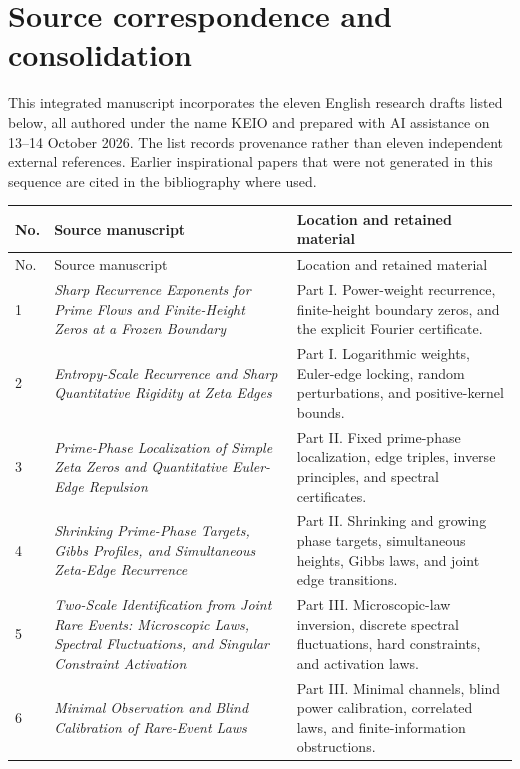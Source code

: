\documentclass[11pt,letterpaper]{article}
\theoremstyle{definition}
\theoremstyle{remark}
\newcommand{\1}{\mathbf 1}
\begin{document}
\clearpage
\section{Source correspondence and consolidation}
\label{sec:source-correspondence}
This integrated manuscript incorporates the eleven English research
drafts listed below, all authored under the name KEIO and prepared with
AI assistance on 13--14 October 2026. The list records provenance rather
than eleven independent external references. Earlier inspirational
papers that were not generated in this sequence are cited in the
bibliography where used.

\begingroup
\small
\setlength{\tabcolsep}{5pt}
\renewcommand{\arraystretch}{1.15}
\begin{longtable}{@{}p{}p{}p{}@{}}
\toprule
No. & Source manuscript & Location and retained material \\
\midrule
\endfirsthead
\toprule
No. & Source manuscript & Location and retained material \\
\midrule
\endhead
\bottomrule
\endfoot
\hypertarget{source:p01}{1} & \emph{Sharp Recurrence Exponents for Prime Flows and Finite-Height Zeros at a Frozen Boundary} & Part I. Power-weight recurrence, finite-height boundary zeros, and the explicit Fourier certificate. \\
\hypertarget{source:p02}{2} & \emph{Entropy-Scale Recurrence and Sharp Quantitative Rigidity at Zeta Edges} & Part I. Logarithmic weights, Euler-edge locking, random perturbations, and positive-kernel bounds. \\
\hypertarget{source:p03}{3} & \emph{Prime-Phase Localization of Simple Zeta Zeros and Quantitative Euler-Edge Repulsion} & Part II. Fixed prime-phase localization, edge triples, inverse principles, and spectral certificates. \\
\hypertarget{source:p04}{4} & \emph{Shrinking Prime-Phase Targets, Gibbs Profiles, and Simultaneous Zeta-Edge Recurrence} & Part II. Shrinking and growing phase targets, simultaneous heights, Gibbs laws, and joint edge transitions. \\
\hypertarget{source:p05}{5} & \emph{Two-Scale Identification from Joint Rare Events: Microscopic Laws, Spectral Fluctuations, and Singular Constraint Activation} & Part III. Microscopic-law inversion, discrete spectral fluctuations, hard constraints, and activation laws. \\
\hypertarget{source:p06}{6} & \emph{Minimal Observation and Blind Calibration of Rare-Event Laws} & Part III. Minimal channels, blind power calibration, correlated laws, and finite-information obstructions. \\

\end{longtable}
\end{document}
